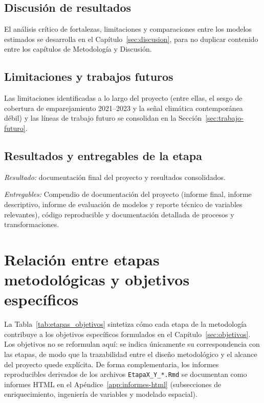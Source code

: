\subsection{Discusión de resultados}
El análisis crítico de fortalezas, limitaciones y comparaciones entre los modelos estimados se desarrolla en el Capítulo~\ref{sec:discusion}, para no duplicar contenido entre los capítulos de Metodología y Discusión.

\subsection{Limitaciones y trabajos futuros}
Las limitaciones identificadas a lo largo del proyecto (entre ellas, el sesgo de cobertura de emparejamiento 2021--2023 y la señal climática contemporánea débil) y las líneas de trabajo futuro se consolidan en la Sección~\ref{sec:trabajo-futuro}.

\subsection{Resultados y entregables de la etapa}

\textit{Resultado:} documentación final del proyecto y resultados consolidados.

\textit{Entregables:} Compendio de documentación del proyecto (informe final, informe descriptivo, informe de evaluación de modelos y reporte técnico de variables relevantes), código reproducible y documentación detallada de procesos y transformaciones.
   

\section{Relación entre etapas metodológicas y objetivos específicos}
\label{sec:etapas_objetivos}

La Tabla~\ref{tab:etapas_objetivos} sintetiza cómo cada etapa de la metodología contribuye a los objetivos específicos formulados en el Capítulo~\ref{sec:objetivos}. Los objetivos no se reformulan aquí: se indica únicamente su correspondencia con las etapas, de modo que la trazabilidad entre el diseño metodológico y el alcance del proyecto quede explícita. De forma complementaria, los informes reproducibles derivados de los archivos \texttt{EtapaX\_Y\_*.Rmd} se documentan como informes HTML en el Apéndice~\ref{app:informes-html} (subsecciones de enriquecimiento, ingeniería de variables y modelado espacial).

